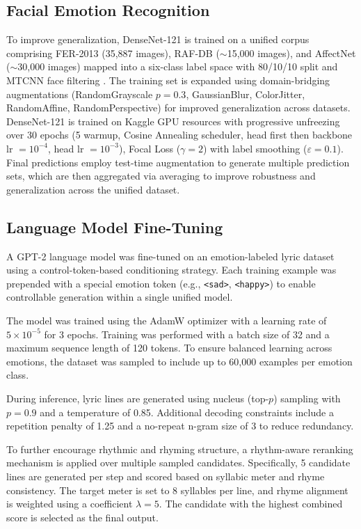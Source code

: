 \documentclass[11pt]{article}
\begin{document}
\subsection{Facial Emotion Recognition}

To improve generalization, DenseNet-121 is trained on a unified corpus 
comprising FER-2013 (35{,}887 images), RAF-DB ($\sim$15{,}000 images), 
and AffectNet ($\sim$30{,}000 images) mapped into a six-class label space 
with 80/10/10 split and MTCNN face filtering \cite{zhang2016joint}. 
The training set is expanded using domain-bridging augmentations 
(RandomGrayscale $p=0.3$, GaussianBlur, ColorJitter, RandomAffine, 
RandomPerspective) for improved generalization across datasets. DenseNet-121 
is trained on Kaggle GPU resources with progressive unfreezing over 30 epochs 
(5 warmup, Cosine Annealing scheduler, head first then backbone lr $=10^{-4}$, 
head lr $=10^{-3}$), Focal Loss \cite{lin2017focal} ($\gamma=2$) with label 
smoothing ($\varepsilon=0.1$). Final predictions employ test-time augmentation 
to generate multiple prediction sets, which are then aggregated via averaging 
to improve robustness and generalization across the unified dataset.

\subsection{Language Model Fine-Tuning}

A GPT-2 language model was fine-tuned on an emotion-labeled lyric dataset using a control-token-based conditioning strategy. Each training example was prepended with a special emotion token (e.g., \texttt{<sad>}, \texttt{<happy>}) to enable controllable generation within a single unified model.

The model was trained using the AdamW optimizer with a learning rate of $5 \times 10^{-5}$ for 3 epochs. Training was performed with a batch size of 32 and a maximum sequence length of 120 tokens. To ensure balanced learning across emotions, the dataset was sampled to include up to 60,000 examples per emotion class.

During inference, lyric lines are generated using nucleus (top-$p$) sampling with $p=0.9$ and a temperature of 0.85. Additional decoding constraints include a repetition penalty of 1.25 and a no-repeat n-gram size of 3 to reduce redundancy.

To further encourage rhythmic and rhyming structure, a rhythm-aware reranking mechanism is applied over multiple sampled candidates. Specifically, 5 candidate lines are generated per step and scored based on syllabic meter and rhyme consistency. The target meter is set to 8 syllables per line, and rhyme alignment is weighted using a coefficient $\lambda = 5$. The candidate with the highest combined score is selected as the final output.
\end{document}
